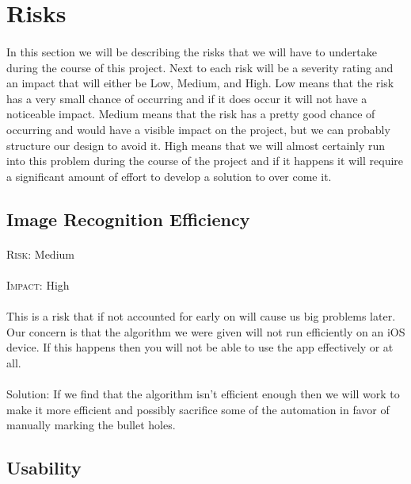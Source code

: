 \section{Risks}
\paragraph{}In this section we will be describing the risks that we will have to undertake during the course of this project. Next to each risk will be a severity rating and an impact that will either be Low, Medium, and High. Low means that the risk has a very small chance of occurring and if it does occur it will not have a noticeable impact. Medium means that the risk has a pretty good chance of occurring and would have a visible impact on the project, but we can probably structure our design to avoid it. High means that we will almost certainly run into this problem during the course of the project and if it happens it will require a significant amount of effort to develop a solution to over come it.

\subsection{Image Recognition Efficiency}
\paragraph{}\textsc{Risk:} Medium
\paragraph{}\textsc{Impact:} High
\paragraph{} This is a risk that if not accounted for early on will cause us big problems later. Our concern is that the algorithm we were given will not run efficiently on an iOS device. If this happens then you will not be able to use the app effectively or at all.
\\
\\Solution: If we find that the algorithm isn't efficient enough then we will work to make it more efficient and possibly sacrifice some of the automation in favor of manually marking the bullet holes.

\subsection{Usability}
